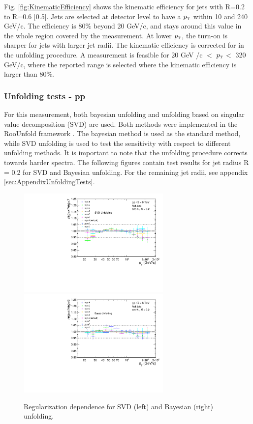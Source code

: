 \documentclass[ALICE]{ALICE_analysis_notes}
\newcommand{\pT}{$p_{\mbox{\tiny T}}$\xspace}
\newcommand{\pp}{pp\xspace}
\begin{document}
Fig. \ref{fig:KinematicEfficiency} shows the kinematic efficiency for jets with R=0.2 to R=0.6 [0.5]. Jets are selected at detector level to have a \pT within 10 and 240 GeV/c. The efficiency is 80$\%$ beyond 20 GeV/c, and stays around this value in the whole region covered by the measurement. At lower \pT, the turn-on is sharper for jets with larger jet radii. The kinematic efficiency is corrected for in the unfolding procedure. A measurement is feasible for 20 GeV /c $<$ \pT $<$ 320 GeV/c, where the reported range is selected where the kinematic efficiency is larger than 80$\%$.

\subsubsection{Unfolding tests - \pp}
\label{subsec:unfoldingTests}

For this measurement, both bayesian unfolding and unfolding based on singular value decomposition (SVD) are used. Both methods were implemented in the RooUnfold framework \cite{roounfold}. The bayesian method is used as the standard method, while SVD unfolding is used to test the sensitivity with respect to different unfolding methods. It is important to note that the unfolding procedure corrects towards harder spectra. The following figures contain test results for jet radius R = 0.2 for SVD and Bayesian unfolding. For the remaining jet radii, see appendix \ref{sec:AppendixUnfoldingTests}.

\begin{figure}
    \centering
    \begin{multicols}{2}
            \includegraphics[width=7.5cm]{figures/UnfoldingComparisons/Regularizations/RatioRegularizationSvd_R02.pdf}
        \vfill\null 
        \columnbreak
            \includegraphics[width=7.5cm]{figures/UnfoldingComparisons/Regularizations/RatioRegularizationBayes_R02.pdf}
        \vfill\null
    \end{multicols}
    \caption{Regularization dependence for SVD (left) and Bayesian (right) unfolding.}
    \label{fig:RegIter}
\end{figure}
\end{document}
